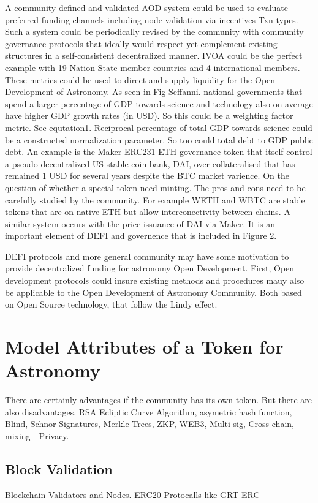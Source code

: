 \documentclass[final,5p,times,twocolumn,authoryear]{elsarticle}
\begin{document}
A community defined and validated AOD system could be used to evaluate preferred funding channels including node validation via incentives Txn types. Such a system could be periodically revised by the community with community governance protocols that ideally would respect yet complement existing structures in a self-consistent decentralized manner. IVOA could be the perfect example with 19 Nation State member countries and 4 international members. These metrics could be used to direct and supply liquidity for the Open Development of Astronomy. As seen in Fig Seffanni. national governments that spend a larger percentage of GDP towards science and technology also on average have higher GDP growth rates (in USD). So this could be a weighting factor metric. See equtation1. Reciprocal percentage of total GDP towards science could be a constructed normalization parameter. So too could total debt to GDP public debt.  An example is the Maker ERC231 ETH governance token that itself control a  pseudo-decentralized US stable coin bank, DAI, over-collateralised that has remained 1 USD for several years despite the BTC market varience.  On the question of whether a special token need minting. The pros and cons need to be carefully studied by the community. For example WETH and WBTC are stable tokens that are on native ETH but allow interconectivity between chains. A similar system occurs with the price issuance of DAI via Maker. It is an important element of DEFI and governence that is included in Figure 2.   

DEFI protocols and more general community may have some motivation to provide decentralized funding for astronomy Open Development. First, Open development protocols could insure existing methods and procedures mauy also be applicable to the Open Development of Astronomy Community. Both  based on Open Source technology, that follow the Lindy effect.
 
 \section{Model Attributes of a Token for Astronomy}
\label{sec:btc4}
There are certainly advantages if the community has its own token. But there are also disadvantages. RSA Ecliptic Curve Algorithm, asymetric hash function, Blind, Schnor Signatures, Merkle Trees, ZKP,  WEB3, Multi-sig, Cross chain, mixing - Privacy. 

\subsection{Block Validation}
\label{subsec: validator}
Blockchain Validators and Nodes. ERC20 Protocalls like GRT ERC   
\end{document}
